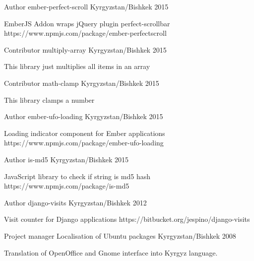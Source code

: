 \begin{cventries}
{    }
  \cventry
    {Author}
    {ember-perfect-scroll}
    {Kyrgyzstan/Bishkek}
    {2015}
    {
      \begin{cvitems}
        \item {EmberJS Addon wraps jQuery plugin perfect-scrollbar https://www.npmjs.com/package/ember-perfectscroll}
      \end{cvitems}
    }
  \cventry
    {Contributor}
    {multiply-array}
    {Kyrgyzstan/Bishkek}
    {2015}
    {
      \begin{cvitems}
        \item {This library just multiplies all items in an array}
      \end{cvitems}
    }
  \cventry
    {Contributor}
    {math-clamp}
    {Kyrgyzstan/Bishkek}
    {2015}
    {
      \begin{cvitems}
        \item {This library clamps a number}
      \end{cvitems}
    }
  \cventry
    {Author}
    {ember-ufo-loading}
    {Kyrgyzstan/Bishkek}
    {2015}
    {
      \begin{cvitems}
        \item {Loading indicator component for Ember applications https://www.npmjs.com/package/ember-ufo-loading}
      \end{cvitems}
    }
  \cventry
    {Author}
    {is-md5}
    {Kyrgyzstan/Bishkek}
    {2015}
    {
      \begin{cvitems}
        \item {JavaScript library to check if string is md5 hash https://www.npmjs.com/package/is-md5}
      \end{cvitems}
    }
  \cventry
    {Author}
    {django-visits}
    {Kyrgyzstan/Bishkek}
    {2012}
    {
      \begin{cvitems}
        \item {Visit counter for Django applications https://bitbucket.org/jespino/django-visits}
      \end{cvitems}
    }
  \cventry
    {Project manager}
    {Localisation of Ubuntu packages}
    {Kyrgyzstan/Bishkek}
    {2008}
    {
      \begin{cvitems}
        \item {Translation of OpenOffice and Gnome interface into Kyrgyz language.}
      \end{cvitems}
    }
\end{cventries}
